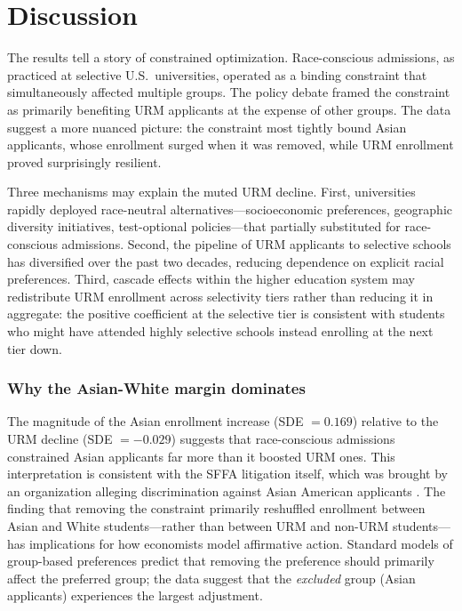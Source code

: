 \documentclass[12pt]{article}
\begin{document}


\section{Discussion}

The results tell a story of constrained optimization. Race-conscious admissions, as practiced at selective U.S.\ universities, operated as a binding constraint that simultaneously affected multiple groups. The policy debate framed the constraint as primarily benefiting URM applicants at the expense of other groups. The data suggest a more nuanced picture: the constraint most tightly bound Asian applicants, whose enrollment surged when it was removed, while URM enrollment proved surprisingly resilient.

Three mechanisms may explain the muted URM decline. First, universities rapidly deployed race-neutral alternatives---socioeconomic preferences, geographic diversity initiatives, test-optional policies---that partially substituted for race-conscious admissions. Second, the pipeline of URM applicants to selective schools has diversified over the past two decades, reducing dependence on explicit racial preferences. Third, cascade effects within the higher education system may redistribute URM enrollment across selectivity tiers rather than reducing it in aggregate: the positive coefficient at the selective tier is consistent with students who might have attended highly selective schools instead enrolling at the next tier down.

\subsubsection*{Why the Asian-White margin dominates} The magnitude of the Asian enrollment increase (SDE $= 0.169$) relative to the URM decline (SDE $= -0.029$) suggests that race-conscious admissions constrained Asian applicants far more than it boosted URM ones. This interpretation is consistent with the SFFA litigation itself, which was brought by an organization alleging discrimination against Asian American applicants \citep{sffa_v_harvard_2023}. The finding that removing the constraint primarily reshuffled enrollment between Asian and White students---rather than between URM and non-URM students---has implications for how economists model affirmative action. Standard models of group-based preferences predict that removing the preference should primarily affect the preferred group; the data suggest that the \textit{excluded} group (Asian applicants) experiences the largest adjustment.
\end{document}
